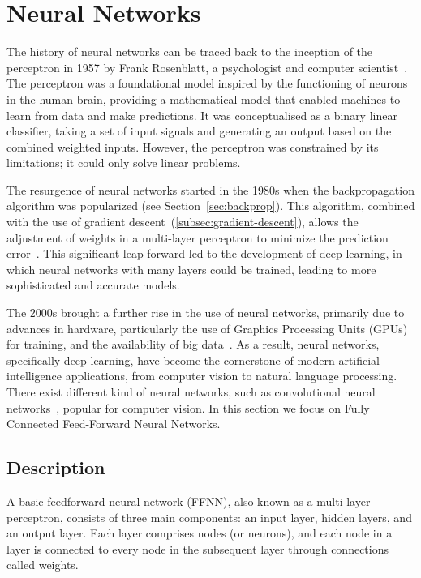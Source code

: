 \chapter{Neural Networks}\label{ch:neural-networks}
The history of neural networks can be traced back to the inception of the perceptron in 1957 by Frank Rosenblatt, a psychologist and computer scientist~\cite{rosenblatt1958perceptron}. The perceptron was a foundational model inspired by the functioning of neurons in the human brain, providing a mathematical model that enabled machines to learn from data and make predictions. It was conceptualised as a binary linear classifier, taking a set of input signals and generating an output based on the combined weighted inputs. However, the perceptron was constrained by its limitations; it could only solve linear problems.
\par The resurgence of neural networks started in the 1980s when the backpropagation algorithm was popularized (see Section~\ref{sec:backprop}). This algorithm, combined with the use of gradient descent~(\ref{subsec:gradient-descent}), allows the adjustment of weights in a multi-layer perceptron to minimize the prediction error~\cite{rumelhart1986learning}. This significant leap forward led to the development of deep learning, in which neural networks with many layers could be trained, leading to more sophisticated and accurate models.
\par The 2000s brought a further rise in the use of neural networks, primarily due to advances in hardware, particularly the use of Graphics Processing Units (GPUs) for training, and the availability of big data~\cite{schmidhuber2015deep}. As a result, neural networks, specifically deep learning, have become the cornerstone of modern artificial intelligence applications, from computer vision to natural language processing. There exist different kind of neural networks, such as convolutional neural networks~\cite{lecun1995convolutional}, popular for computer vision. In this section we focus on Fully Connected Feed-Forward Neural Networks. 
\section{Description}
A basic feedforward neural network (FFNN), also known as a multi-layer perceptron, consists of three main components: an input layer, hidden layers, and an output layer. Each layer comprises nodes (or neurons), and each node in a layer is connected to every node in the subsequent layer through connections called weights.

